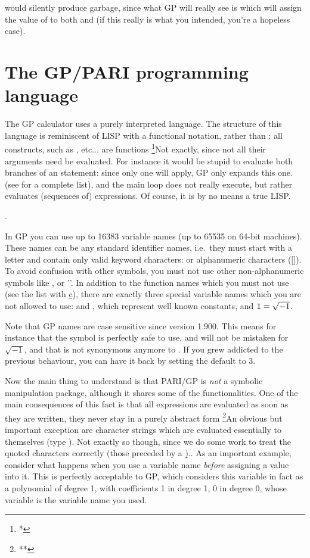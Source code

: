 \noindent would silently produce garbage, since what GP will really see is
 which will assign the value of  to both  and
 (if this really is what you intended, you're a hopeless case).

\section{The GP/PARI programming language}

The GP calculator uses a purely interpreted language. The structure of this
language is reminiscent of LISP with a functional notation, 
rather than : all  constructs, such as
,  etc... are functions \footnote{*}{Not exactly, since
not all their arguments need be evaluated. For instance it would be stupid
to evaluate both branches of an  statement: since only one will
apply, GP only expands this one.} (see  for a
complete list), and the main loop does not really execute, but rather
evaluates (sequences of) expressions. Of course, it is by no means a true
LISP.

.

  In GP you can use up to 16383 variable names (up to 65535 on 64-bit
machines). These names can be any standard identifier names, i.e.~they must
start with a letter and contain only valid keyword characters: \kbd{\_} or
alphanumeric characters ([]). To avoid confusion with other
symbols, you must not use other non-alphanumeric symbols like \kbd{\$}, or
''. In addition to the function names which you must not use (see the
list with \b{c}), there are exactly three special variable names which you
are not allowed to use:  and , which represent well known
constants, and ${\tt I}=\sqrt{-1}$.

Note that GP names are case sensitive since version 1.900. This means for
instance that the symbol  is perfectly safe to use, and will not be
mistaken for $\sqrt{-1}$, and that  is not synonymous anymore to
. If you grew addicted to the previous behaviour, you can have it back
by setting the default  to $3$.

  Now the main thing to understand is that PARI/GP is \emph{not} a symbolic
manipulation package, although it shares some of the functionalities. One of
the main consequences of this fact is that all expressions are evaluated as
soon as they are written, they never stay in a purely abstract form%
\footnote{**}{An obvious but important exception are character strings which
are evaluated essentially to themselves (type ). Not exactly
so though, since we do some work to treat the quoted characters correctly
(those preceded by a \b{)}.}.
%
As an important example, consider what happens when you use a variable name
\emph{before} assigning a value into it. This is perfectly acceptable to GP,
which considers this variable in fact as a polynomial of degree 1, with
coefficients 1 in degree 1, 0 in degree 0, whose variable is the variable
name you used.

